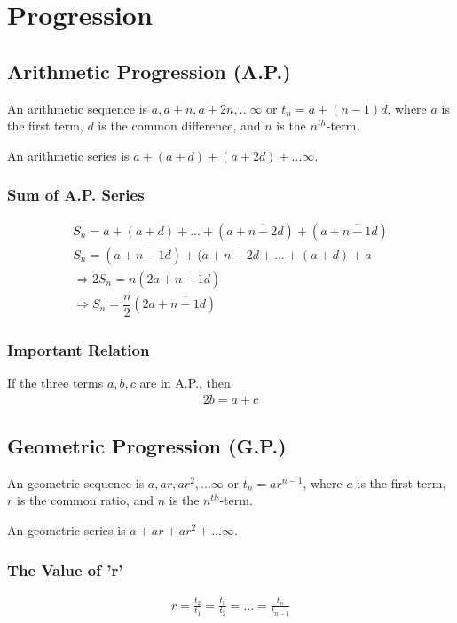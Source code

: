 \chapter{Progression}
\section{Arithmetic Progression (A.P.)}
An arithmetic sequence is $a,a+n,a+2n,...\infty$ or $t_n=a+(n-1)d$, where $a$ is the first term, $d$ is the common difference, and $n$ is the $n^{th}$-term.

An arithmetic series is $a+(a+d)+(a+2d)+...\infty$.

\subsection{Sum of A.P. Series}
\begin{align}
	S_n=a+(a+d)+...+(a+\overline{n-2}d)+(a+\overline{n-1}d)\nonumber\\
	S_n=(a+\overline{n-1}d)+(a+\overline{n-2}d+...+(a+d)+ a\nonumber\\
	\Rightarrow 2S_n=n(2a+\overline{n-1}d)\nonumber\\
	\Rightarrow S_n=\dfrac{n}{2}(2a+\overline{n-1}d)
\end{align}

\subsection{Important Relation}
If the three terms $a,b,c$ are in A.P., then
\begin{align}
	2b=a+c
\end{align}


\section{Geometric Progression (G.P.)}
An geometric sequence is $a,ar,ar^2,...\infty$ or $t_n=ar^{n-1}$, where $a$ is the first term, $r$ is the common ratio, and $n$ is the $n^{th}$-term.

An geometric series is $a+ar+ar^2+...\infty$.

\subsection{The Value of 'r'}
\begin{align}
	r=\frac{t_2}{t_1}=\frac{t_3}{t_2}=...=\frac{t_{n}}{t_{n-1}}
\end{align}

